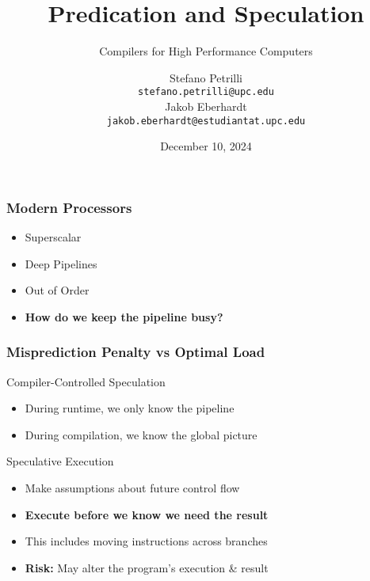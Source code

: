 \documentclass[presentation]{beamer}
\title{Predication and Speculation}%
\subtitle{Compilers for High Performance Computers}%
\author{Stefano Petrilli\\ \texttt{stefano.petrilli@upc.edu}\\[1ex] %
  Jakob Eberhardt\\ \texttt{jakob.eberhardt@estudiantat.upc.edu}}
\date{December 10, 2024}
\begin{document}
\frame{\titlepage}


\begin{frame}[fragile]
\frametitle{Modern Processors}
\begin{itemize}[<+->]
    \item Superscalar
    \item Deep Pipelines
    \item Out of Order
    \item \textbf{How do we keep the pipeline busy?}
\end{itemize}
\end{frame}



\begin{frame}[fragile]
\frametitle{Misprediction Penalty vs Optimal Load}
\begin{center}
    
\end{center}
\end{frame}

% 

\begin{frame}{Compiler-Controlled Speculation}
\begin{itemize}
    \item During runtime, we only know the pipeline
    \item During compilation, we know the global picture
\end{itemize}
    \begin{block}{Speculative Execution}
        \begin{itemize}
            \item Make assumptions about future control flow
            \item \textbf{Execute before we know we need the result} 
            \item This includes moving instructions across branches
            \item \textbf{Risk:} May alter the program's execution \& result
        \end{itemize}
    \end{block}
\end{frame}
\end{document}
